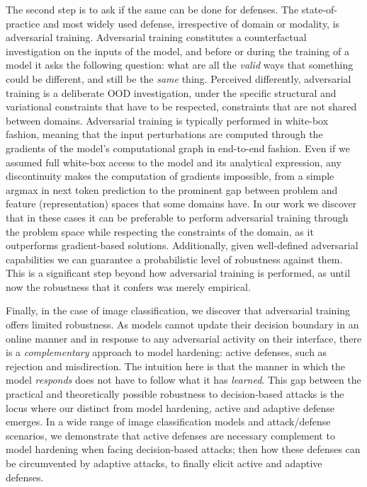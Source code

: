 The second step is to ask if the same can be done for defenses.
The state-of-practice and most widely used defense, irrespective of domain or modality, is adversarial training.
Adversarial training constitutes a counterfactual investigation on the inputs of the model, and before or during the training of a model it asks the following question: what are all the \textit{valid} ways that something could be different, and still be the \textit{same} thing.
Perceived differently, adversarial training is a deliberate \gls{OOD} investigation, under the specific structural and variational constraints that have to be respected, constraints that are not shared between domains.
Adversarial training is typically performed in white-box fashion, meaning that the input perturbations are computed through the gradients of the model's computational graph in end-to-end fashion.
Even if we assumed full white-box access to the model and its analytical expression, any discontinuity makes the computation of gradients impossible, from a simple argmax in next token prediction to the prominent gap between problem and feature (representation) spaces that some domains have.
In our work we discover that in these cases it can be preferable to perform adversarial training through the problem space while respecting the constraints of the domain, as it outperforms gradient-based solutions.
Additionally, given well-defined adversarial capabilities we can guarantee a probabilistic level of robustness against them.
This is a significant step beyond how adversarial training is performed, as until now the robustness that it confers was merely empirical.

Finally, in the case of image classification, we discover that adversarial training offers limited robustness.
As models cannot update their decision boundary in an online manner and in response to any adversarial activity on their interface, there is a \textit{complementary} approach to model hardening: active defenses, such as rejection and misdirection.
The intuition here is that the manner in which the model \textit{responds} does not have to follow what it has \textit{learned}.
This gap between the practical and theoretically possible robustness to decision-based attacks is the locus where our distinct from model hardening, active and adaptive defense emerges.
In a wide range of image classification models and attack/defense scenarios, we demonstrate that active defenses are necessary complement to model hardening when facing decision-based attacks; then how these defenses can be circumvented by adaptive attacks, to finally elicit active and adaptive defenses.

